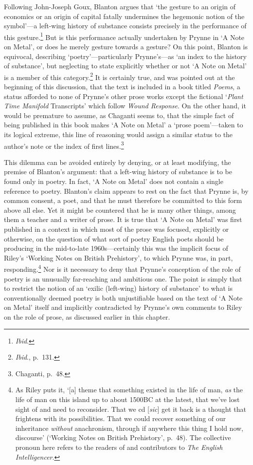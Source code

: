\documentclass[]{article}
\begin{document}
\noindent Following John-Joseph Goux, Blanton argues that ‘the gesture
to an origin of economics or an origin of capital fatally undermines the
hegemonic notion of the symbol’—a left-wing history of substance
consists precisely in the performance of this gesture.\footnote{\emph{Ibid}.}
But is this performance actually undertaken by Prynne in ‘A Note on
Metal’, or does he merely gesture towards a gesture? On this point,
Blanton is equivocal, describing ‘poetry’—particularly Prynne’s—as ‘an
index to the history of substance’, but neglecting to state explicitly
whether or not ‘A Note on Metal’ is a member of this category.\footnote{\emph{Ibid}.,
  p.~131.} It is certainly true, and was pointed out at the beginning of
this discussion, that the text is included in a book titled
\emph{Poems}, a status afforded to none of Prynne’s other prose works
except the fictional ‘\emph{Plant Time Manifold} Transcripts’ which
follow \emph{Wound Response}. On the other hand, it would be premature
to assume, as Chaganti seems to, that the simple fact of being published
in this book makes ‘A Note on Metal’ a ‘prose poem’—taken to its logical
extreme, this line of reasoning would assign a similar status to the
author’s note or the index of first lines.\footnote{Chaganti, p.~48.}

This dilemma can be avoided entirely by denying, or at least modifying,
the premise of Blanton’s argument: that a left-wing history of substance
is to be found only in poetry. In fact, ‘A Note on Metal’ does not
contain a single reference to poetry. Blanton’s claim appears to rest on
the fact that Prynne is, by common consent, a poet, and that he must
therefore be committed to this form above all else. Yet it might be
countered that he is many other things, among them a teacher and a
writer of prose. It is true that ‘A Note on Metal’ was first published
in a context in which most of the prose was focused, explicitly or
otherwise, on the question of what sort of poetry English poets should
be producing in the mid-to-late 1960s—certainly this was the implicit
focus of Riley’s ‘Working Notes on British Prehistory’, to which Prynne
was, in part, responding.\footnote{As Riley puts it, ‘{[}a{]} theme that
  something existed in the life of man, \emph{as} the life of man on
  this island up to about 1500BC at the latest, that we’ve lost sight of
  and need to reconsider. That we cd {[}\emph{sic}{]} get it back is a
  thought that frightens with its possibilities. That we could recover
  something of our inheritance \emph{without} anachronism, through if
  anywhere this thing I hold now, discourse’ (‘Working Notes on British
  Prehistory’, p.~48). The collective pronoun here refers to the readers
  of and contributors to \emph{The English Intelligencer}.} Nor is it
necessary to deny that Prynne’s conception of the role of poetry is an
unusually far-reaching and ambitious one. The point is simply that to
restrict the notion of an ‘exilic (left-wing) history of substance’ to
what is conventionally deemed poetry is both unjustifiable based on the
text of ‘A Note on Metal’ itself and implicitly contradicted by Prynne’s
own comments to Riley on the role of prose, as discussed earlier in this
chapter.
\end{document}
